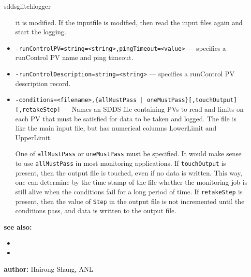\begin{sddsprog}{sddsglitchlogger}
\begin{itemize}
                it is modified. If the inputfile is modified, then read the input files again and start
                the logging.
  \item {\tt -runControlPV=string=<string>,pingTimeout=<value>} --- specifies a runControl PV name
                and ping timeout.
  \item {\tt -runControlDescription=string=<string>} --- specifies a runControl PV description record.
  \item {\verb+-conditions=<filename>,{allMustPass | oneMustPass}[,touchOutput][,retakeStep]+} ---
                   Names an SDDS file containing PVs to read and limits on each PV that must
                   be satisfied for data to be taken and logged.  The file is like the main
                   input file, but has numerical columns LowerLimit and UpperLimit.

                One of \verb+allMustPass+ or \verb+oneMustPass+ must be specified. It would make sense
                to use \verb+allMustPass+ in most monitoring applications.
                If \verb+touchOutput+ is present, then the output file is touched, even if no data
                is written. This way, one can determine by the time stamp of the file
                whether the monitoring job is still alive
                when the conditions fail for a long period of time. If \verb+retakeStep+ is
                present, then the value of \verb+Step+ in the output file is not
                incremented until the conditions pass, and data is written to the output file.
\end{itemize}

\item \textbf{see also:}
\begin{itemize}
  \item {}
  \item {}
\end{itemize}
\item \textbf{author:} Hairong Shang, ANL
\end{sddsprog}
